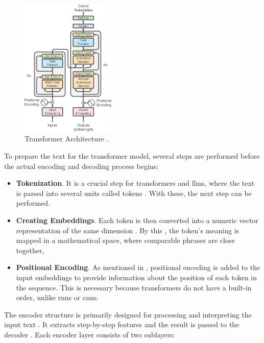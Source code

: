 \begin{figure}[htbp]
  \centering
   \includegraphics[width=0.4\textwidth]{../extra/transformer.png}
   \caption[Transformer Architecture.]{Transformer Architecture \cite{vaswani_attention_2017}.} 
   \label{fig:transformer-architecture}
\end{figure}

 To prepare the text for the transformer model, several steps are performed before the actual encoding and decoding process begins:

\begin{itemize}
   \item \textbf{Tokenization}. It is a crucial step for transformers and \ac{llms}, where the text is parsed into several units called tokens \cite{naveed_comprehensive_2024,raiaan_review_2024,zhao_survey_2025}. With these, the next step can be performed.
   \item \textbf{Creating Embeddings}. Each token is then converted into a numeric vector representation of the same dimension \cite{vaswani_attention_2017}. By this \cite{raiaan_review_2024}, the token's meaning is mapped in a mathematical space, where comparable phrases are close together, 
   \item \textbf{Positional Encoding}. As mentioned in \cite{vaswani_attention_2017}, positional encoding is added to the input embeddings to provide information about the position of each token in the sequence. This is necessary because transformers do not have a built-in order, unlike \ac{rnns} or \ac{cnns}. 
\end{itemize}

 The encoder structure is primarily designed for processing and interpreting the input text \cite{wang_history_2024}. It extracts step-by-step features and the result is passed to the decoder \cite{liu_understanding_2024}. Each encoder layer consists of two sublayers: 

